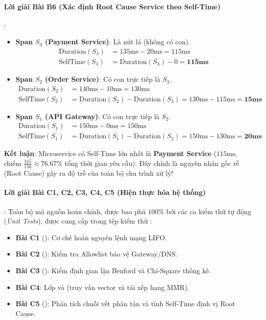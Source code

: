 \paragraph{Lời giải Bài B6 (Xác định Root Cause Service theo Self-Time)}:
\begin{itemize}
  \item \textbf{Span $S_3$ (Payment Service)}:
  Là nút lá (không có con).
  \begin{align*}
  \text{Duration}(S_3) &= 135\text{ms} - 20\text{ms} = 115\text{ms} \\
  \text{SelfTime}(S_3) &= \text{Duration}(S_3) - 0 = \mathbf{115\text{ms}}
  \end{align*}

  \item \textbf{Span $S_2$ (Order Service)}:
  Có con trực tiếp là $S_3$.
  \begin{align*}
  \text{Duration}(S_2) &= 140\text{ms} - 10\text{ms} = 130\text{ms} \\
  \text{SelfTime}(S_2) &= \text{Duration}(S_2) - \text{Duration}(S_3) = 130\text{ms} - 115\text{ms} = \mathbf{15\text{ms}}
  \end{align*}

  \item \textbf{Span $S_1$ (API Gateway)}:
  Có con trực tiếp là $S_2$.
  \begin{align*}
  \text{Duration}(S_1) &= 150\text{ms} - 0\text{ms} = 150\text{ms} \\
  \text{SelfTime}(S_1) &= \text{Duration}(S_1) - \text{Duration}(S_2) = 150\text{ms} - 130\text{ms} = \mathbf{20\text{ms}}
  \end{align*}
\end{itemize}
\textbf{Kết luận}:
Microservice có Self-Time lớn nhất là \textbf{Payment Service} ($115\text{ms}$, chiếm $\frac{115}{150} \approx 76.67\%$ tổng thời gian yêu cầu). Đây chính là nguyên nhân gốc rễ (Root Cause) gây ra độ trễ của toàn bộ chu trình xử lý!

\paragraph{Lời giải Bài C1, C2, C3, C4, C5 (Hiện thực hóa hệ thống)}:
Toàn bộ mã nguồn hoàn chỉnh, được bao phủ $100\%$ bởi các ca kiểm thử tự động (\textit{Unit Tests}), được cung cấp trong tệp kiểm thử :
\begin{itemize}
  \item \textbf{Bài C1} (): Cơ chế hoàn nguyên lệnh mạng LIFO.
  \item \textbf{Bài C2} (): Kiểm tra Allowlist bảo vệ Gateway/DNS.
  \item \textbf{Bài C3} (): Kiểm định gian lận Benford và Chi-Square thống kê.
  \item \textbf{Bài C4}: Lớp  và  (truy vấn vector và tái xếp hạng MMR).
  \item \textbf{Bài C5} (): Phân tích chuỗi vết phân tán và tính Self-Time định vị Root Cause.
\end{itemize}

